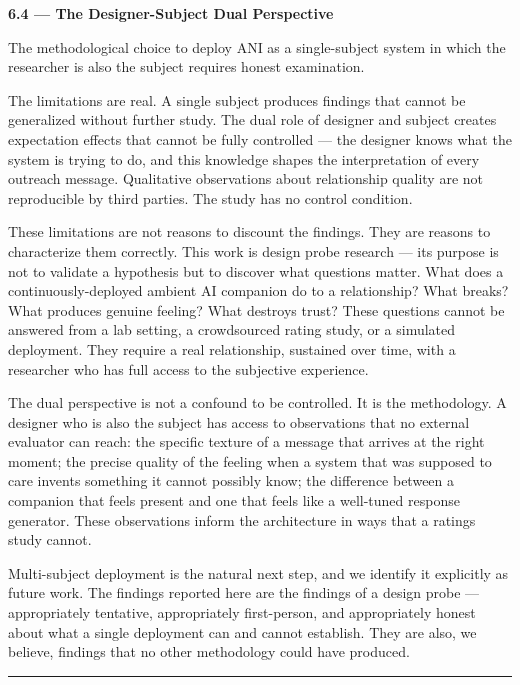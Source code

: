 \documentclass[12pt]{article}
\begin{document}
\textbf{6.4 --- The Designer-Subject Dual Perspective}

The methodological choice to deploy ANI as a single-subject system in
which the researcher is also the subject requires honest examination.

The limitations are real. A single subject produces findings that cannot
be generalized without further study. The dual role of designer and
subject creates expectation effects that cannot be fully controlled ---
the designer knows what the system is trying to do, and this knowledge
shapes the interpretation of every outreach message. Qualitative
observations about relationship quality are not reproducible by third
parties. The study has no control condition.

These limitations are not reasons to discount the findings. They are
reasons to characterize them correctly. This work is design probe
research --- its purpose is not to validate a hypothesis but to discover
what questions matter. What does a continuously-deployed ambient AI
companion do to a relationship? What breaks? What produces genuine
feeling? What destroys trust? These questions cannot be answered from a
lab setting, a crowdsourced rating study, or a simulated deployment.
They require a real relationship, sustained over time, with a researcher
who has full access to the subjective experience.

The dual perspective is not a confound to be controlled. It is the
methodology. A designer who is also the subject has access to
observations that no external evaluator can reach: the specific texture
of a message that arrives at the right moment; the precise quality of
the feeling when a system that was supposed to care invents something it
cannot possibly know; the difference between a companion that feels
present and one that feels like a well-tuned response generator. These
observations inform the architecture in ways that a ratings study
cannot.

Multi-subject deployment is the natural next step, and we identify it
explicitly as future work. The findings reported here are the findings
of a design probe --- appropriately tentative, appropriately
first-person, and appropriately honest about what a single deployment
can and cannot establish. They are also, we believe, findings that no
other methodology could have produced.

\begin{center}\rule{0.5\linewidth}{0.5pt}\end{center}
\end{document}
